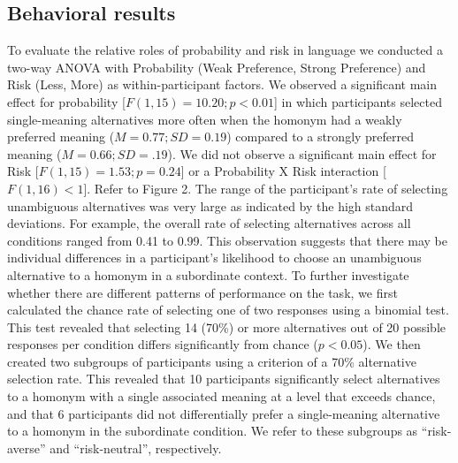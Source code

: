 \documentclass[final,authoryear,5p,times,twocolumn]{elsarticle}
\begin{document}
\subsection{Behavioral results}
To evaluate the relative roles of probability and risk in language we conducted a two-way ANOVA with Probability (Weak Preference, Strong Preference) and Risk (Less, More) as within-participant factors.  We observed a significant main effect for probability [$F(1,15)=10.20; p<0.01$] in which participants selected single-meaning alternatives more often when the homonym had a weakly preferred meaning ($M=0.77; SD=0.19$) compared to a strongly preferred meaning ($M=0.66; SD=.19$).  We did not observe a significant main effect for Risk [$F(1,15)=1.53; p=0.24$] or a Probability X Risk interaction [$F(1,16)<1$].  Refer to Figure 2.
The range of the participant’s rate of selecting unambiguous alternatives was very large as indicated by the high standard deviations.  For example, the overall rate of selecting alternatives across all conditions ranged from 0.41 to 0.99.  This observation suggests that there may be individual differences in a participant’s likelihood to choose an unambiguous alternative to a homonym in a subordinate context.  To further investigate whether there are different patterns of performance on the task, we first calculated the chance rate of selecting one of two responses using a binomial test.  This test revealed that selecting 14 (70\%) or more alternatives out of 20 possible responses per condition differs significantly from chance ($p<0.05$).  We then created two subgroups of participants using a criterion of a 70\% alternative selection rate.  This revealed that 10 participants significantly select alternatives to a homonym with a single associated meaning at a level that exceeds chance, and that 6 participants did not differentially prefer a single-meaning alternative to a homonym in the subordinate condition.  We refer to these subgroups as “risk-averse” and “risk-neutral”, respectively.
\end{document}
